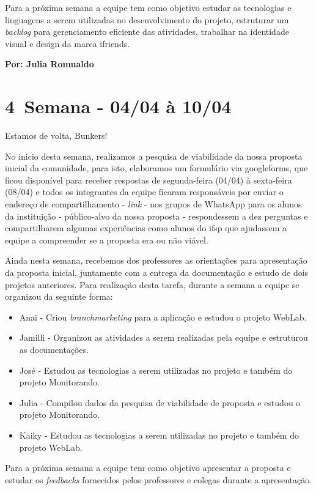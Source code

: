Para a próxima semana a equipe tem como objetivo estudar as tecnologias e linguagens a serem utilizadas no desenvolvimento do projeto, estruturar um \textsl{backlog} para gerenciamento eficiente das atividades, trabalhar na identidade visual e design da marca \gls{ifriends}.    

\textbf{Por: Julia Romualdo}

\section{4\textordfeminine \, Semana - 04/04 à 10/04}
Estamos de volta, Bunkers!

No inicio desta semana, realizamos a pesquisa de viabilidade da nossa proposta inicial da comunidade, para isto, elaboramos um formulário via \gls{googleforms}, que ficou disponível para receber respostas de segunda-feira (04/04) à sexta-feira (08/04) e todos os integrantes da equipe ficaram responsáveis por enviar o endereço de compartilhamento - \textsl{link} - nos grupos de \gls{WhatsApp} para os alunos da instituição - público-alvo da nossa proposta - respondessem a dez perguntas e compartilharem algumas experiências como alunos do \acs{ifsp} que ajudassem a equipe a compreender se a proposta era ou não viável.

Ainda nesta semana, recebemos dos professores as orientações para apresentação da proposta inicial, juntamente com a entrega da documentação e estudo de dois projetos anteriores. Para realização desta tarefa, durante a semana a equipe se organizou da seguinte forma:
\begin{itemize}
    \item Anai -  Criou \textsl{branchmarketing} para a aplicação e estudou o projeto WebLab.
    \item Jamilli - Organizou as atividades a serem realizadas pela equipe e estruturou as documentações.
    \item José - Estudou as tecnologias a serem utilizadas no projeto e também do projeto Monitorando.
    \item Julia - Compilou dados da pesquisa de viabilidade de proposta e estudou o  projeto Monitorando.
    \item Kaiky -  Estudou as tecnologias a serem utilizadas no projeto e também do projeto WebLab.
\end{itemize}
Para a próxima semana a equipe tem como objetivo apresentar a proposta e estudar os \textsl{feedbacks} fornecidos pelos professores e colegas durante a apresentação.

